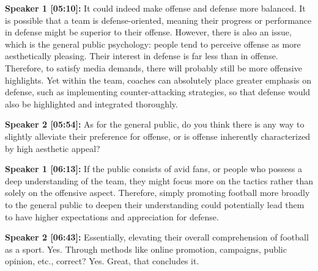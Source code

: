\documentclass[11pt,a4paper]{article}
\begin{document}
\begin{linenumbers}
\vspace{0.5em}
\noindent \textbf{Speaker 1 [05:10]:} It could indeed make offense and defense more balanced. It is possible that a team is defense-oriented, meaning their progress or performance in defense might be superior to their offense. However, there is also an issue, which is the general public psychology: people tend to perceive offense as more aesthetically pleasing. Their interest in defense is far less than in offense. Therefore, to satisfy media demands, there will probably still be more offensive highlights. Yet within the team, coaches can absolutely place greater emphasis on defense, such as implementing counter-attacking strategies, so that defense would also be highlighted and integrated thoroughly.

\vspace{0.5em}
\noindent \textbf{Speaker 2 [05:54]:} As for the general public, do you think there is any way to slightly alleviate their preference for offense, or is offense inherently characterized by high aesthetic appeal?

\vspace{0.5em}
\noindent \textbf{Speaker 1 [06:13]:} If the public consists of avid fans, or people who possess a deep understanding of the team, they might focus more on the tactics rather than solely on the offensive aspect. Therefore, simply promoting football more broadly to the general public to deepen their understanding could potentially lead them to have higher expectations and appreciation for defense.

\vspace{0.5em}
\noindent \textbf{Speaker 2 [06:43]:} Essentially, elevating their overall comprehension of football as a sport. Yes. Through methods like online promotion, campaigns, public opinion, etc., correct? Yes. Great, that concludes it.

\end{linenumbers}
\end{document}
